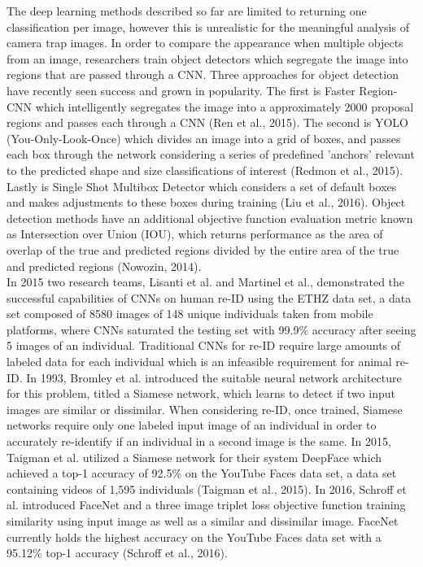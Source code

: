 \documentclass[11pt]{article}
\begin{document}
The deep learning methods described so far are limited to returning one classification per image, however this is unrealistic for the meaningful analysis of camera trap images. In order to compare the appearance when multiple objects from an image, researchers train object detectors which segregate the image into regions that are passed through a CNN. Three approaches for object detection have recently seen success and grown in popularity. The first is Faster Region-CNN which intelligently segregates the image into a approximately 2000 proposal regions and passes each through a CNN (Ren et al., 2015). The second is YOLO (You-Only-Look-Once) which divides an image into a grid of boxes, and passes each box through the network considering a series of predefined 'anchors' relevant to the predicted shape and size classifications of interest (Redmon et al., 2015). Lastly is Single Shot Multibox Detector which considers a set of default boxes and makes adjustments to these boxes during training (Liu et al., 2016). Object detection methods have an additional objective function evaluation metric known as Intersection over Union (IOU), which returns performance as the area of overlap of the true and predicted regions divided by the entire area of the true and predicted regions (Nowozin, 2014). 
\newline
\\
In 2015 two research teams, Lisanti et al. and Martinel et al., demonstrated the successful capabilities of CNNs on human re-ID using the ETHZ data set, a data set composed of 8580 images of 148 unique individuals taken from mobile platforms, where CNNs saturated the testing set with 99.9\% accuracy after seeing 5 images of an individual. Traditional CNNs for re-ID require large amounts of labeled data for each individual which is an infeasible requirement for animal re-ID. In 1993, Bromley et al. introduced the suitable neural network architecture for this problem, titled a Siamese network, which learns to detect if two input images are similar or dissimilar. When considering re-ID, once trained, Siamese networks require only one labeled input image of an individual in order to accurately re-identify if an individual in a second image is the same. In 2015, Taigman et al. utilized a Siamese network for their system DeepFace which achieved a top-1 accuracy of 92.5\% on the YouTube Faces data set, a data set containing videos of 1,595 individuals (Taigman et al., 2015). In 2016, Schroff et al. introduced FaceNet and a three image triplet loss objective function training similarity using input image as well as a similar and dissimilar image. FaceNet currently holds the highest accuracy on the YouTube Faces data set with a 95.12\% top-1 accuracy (Schroff et al., 2016). 
\newline
\end{document}
